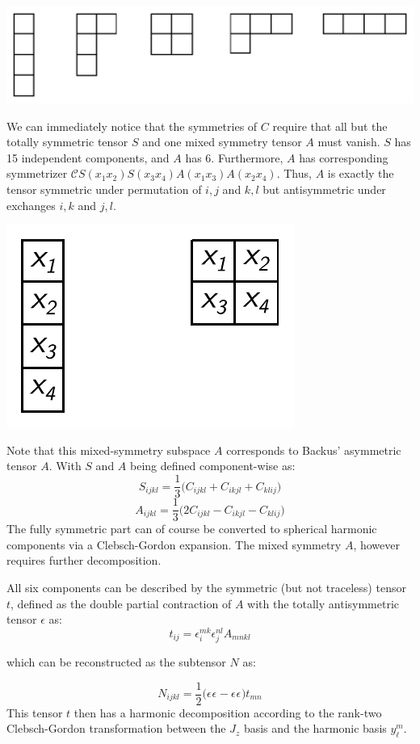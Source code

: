 \documentclass[10pt,a4paper]{article}
\begin{document}
\begin{center}
\includegraphics[scale=0.7]{rank4_young.pdf}
\end{center}
We can immediately notice that the symmetries of $C$ require that all but the totally symmetric tensor $S$ and one mixed symmetry tensor $A$ must vanish. $S$ has 15 independent components, and $A$ has 6. Furthermore, $A$ has corresponding symmetrizer $\mathcal{C}S(x_1x_2)S(x_3x_4)A(x_1x_3)A(x_2x_4)$. Thus, $A$ is exactly the tensor symmetric under permutation of $i,j$ and $k,l$ but antisymmetric under exchanges $i,k$ and $j,l$.
\begin{center}
\includegraphics[scale=0.7]{elastic_young.pdf}
\end{center}
Note that this mixed-symmetry subspace $A$ corresponds to Backus' \cite{backus1970geometrical} asymmetric tensor $A$. With $S$ and $A$ being defined component-wise as:
$$
S_{ijkl}=\frac{1}{3}\big( C_{ijkl} + C_{ikjl} + C_{klij} \big)
$$
$$
A_{ijkl} = \frac{1}{3}\big( 2C_{ijkl} -C_{ikjl} -C_{klij}  \big)
$$
The fully symmetric part can of course be converted to spherical harmonic components via a Clebsch-Gordon expansion. The mixed symmetry $A$, however requires further decomposition. 

All six components can be described by the symmetric (but not traceless) tensor $t$, defined as the double partial contraction of $A$ with the totally antisymmetric tensor $\epsilon$ as:
$$
t_{ij} = \epsilon_{i}^{mk}\epsilon_{j}^{nl}A_{mnkl}
$$
\begin{center}
which can be reconstructed as the subtensor $N$ as:
\end{center}
$$
N_{ijkl}= \frac{1}{2}\big(\epsilon^{}\epsilon^{} - \epsilon^{} \epsilon^{} \big)t_{mn}
$$
This tensor $t$ then has a harmonic decomposition according to the rank-two Clebsch-Gordon transformation between the $J_z$ basis and the harmonic basis $y_{\ell}^m$. 

 
\nocite{*}







\end{document}
